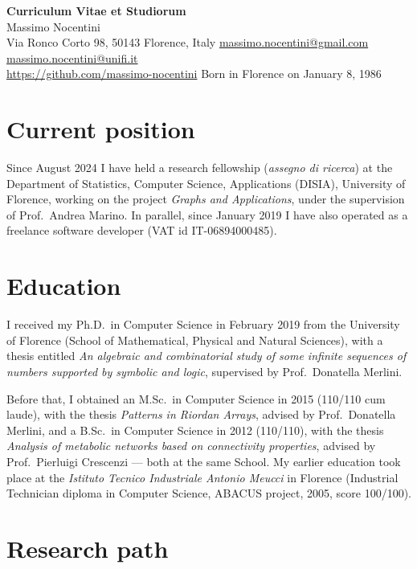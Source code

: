 \documentclass[11pt,a4paper]{article}
\begin{document}
\begin{center}
{\Large\bfseries Curriculum Vitae et Studiorum}\\[0.3em]
{\large Massimo Nocentini}\\[0.2em]
\small
Via Ronco Corto 98, 50143 Florence, Italy \quad
\href{mailto:massimo.nocentini@gmail.com}{massimo.nocentini@gmail.com} \quad
\href{mailto:massimo.nocentini@unifi.it}{massimo.nocentini@unifi.it}\\
\url{https://github.com/massimo-nocentini} \quad
Born in Florence on January 8, 1986
\end{center}

\section*{Current position}

Since August 2024 I have held a research fellowship (\emph{assegno di ricerca}) at the Department of Statistics, Computer Science, Applications (DISIA), University of Florence, working on the project \emph{Graphs and Applications}, under the supervision of Prof.\ Andrea Marino. In parallel, since January 2019 I have also operated as a freelance software developer (VAT id IT-06894000485).

\section*{Education}

I received my Ph.D.\ in Computer Science in February 2019 from the University of Florence (School of Mathematical, Physical and Natural Sciences), with a thesis entitled \emph{An algebraic and combinatorial study of some infinite sequences of numbers supported by symbolic and logic}, supervised by Prof.\ Donatella Merlini.

Before that, I obtained an M.Sc.\ in Computer Science in 2015 (110/110 cum laude), with the thesis \emph{Patterns in Riordan Arrays}, advised by Prof.\ Donatella Merlini, and a B.Sc.\ in Computer Science in 2012 (110/110), with the thesis \emph{Analysis of metabolic networks based on connectivity properties}, advised by Prof.\ Pierluigi Crescenzi --- both at the same School. My earlier education took place at the \emph{Istituto Tecnico Industriale Antonio Meucci} in Florence (Industrial Technician diploma in Computer Science, ABACUS project, 2005, score 100/100).

\section*{Research path}
\end{document}
